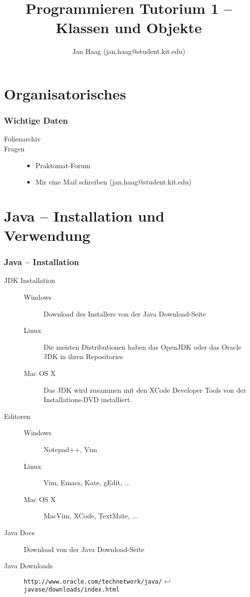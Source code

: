 \documentclass{beamer}
\author{Jan Haag (jan.haag@student.kit.edu)}
\title{Programmieren Tutorium 1 -- Klassen und Objekte}
\institute{Institut f\"{u}r Zeritfizierbare und Vertrauensw\"{u}rdige Informatiksysteme (ZVI)}
\begin{document}
\begin{frame}
\maketitle
\end{frame}

\begin{frame}
\tableofcontents
\end{frame}

\section{Organisatorisches}
\begin{frame}
\frametitle{Wichtige Daten}
\begin{description}
\item[Folienarchiv]
\item[Fragen]
\begin{itemize}
\item Praktomat-Forum
\item Mir eine Mail schreiben (jan.haag@student.kit.edu)
\end{itemize}
\end{description}
\end{frame}

\section{Java -- Installation und Verwendung}
\begin{frame}[fragile]
\frametitle{Java -- Installation}
\begin{description}
\item[JDK Installation]
\begin{description}
\item[Windows] Download des Installers von der Java Download-Seite
\item[Linux] Die meisten Distributionen haben das OpenJDK oder das Oracle JDK in ihren Repositories
\item[Mac OS X] Das JDK wird zusammen mit den XCode Developer Tools von der Installations-DVD installiert.
\end{description}
\item[Editoren]
\begin{description}
\item[Windows] Notepad++, Vim
\item[Linux] Vim, Emacs, Kate, gEdit, ...
\item[Mac OS X] MacVim, XCode, TextMate, ...
\end{description}
\item[Java Docs] Download von der Java Download-Seite
\item[Java Downloads] \verb|http://www.oracle.com/technetwork/java/|$\hookleftarrow$\\
\verb|javase/downloads/index.html|
\end{description}
\end{frame}
\end{document}
